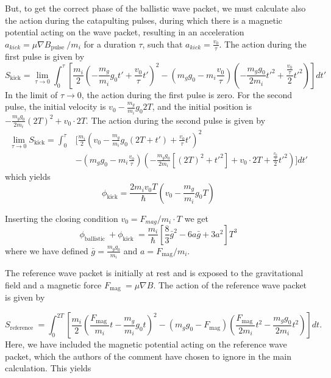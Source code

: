 \documentclass[aps,prx,onecolumn,superscriptaddress,longbibliography]{revtex4-2}
\begin{document}
\begin{appendix}
But, to get the correct phase of the ballistic wave packet, we must calculate also the action during the catapulting pulses, during which there is a magnetic potential acting on the wave packet, resulting in an acceleration $a_{kick} = \mu\nabla B_{\text {pulse }}/m_i$ for a duration $\tau$, such that $a_{kick}= \frac{v_0}{\tau}$. The action during the first pulse is given by
\begin{equation}
    S_{\text {kick}}=\lim _{\tau \rightarrow 0}\int_{0}^{\tau}\left[\frac{m_i}{2}\left(-\frac{m_g}{m_i} g_0 t' +\frac{v_0}{\tau} t'\right)^2-(m_g g_0 - m_i \frac{v_0}{\tau})\left(-\frac{m_g g_0}{2 m_i} t'^2 +\frac{\frac{v_0}{\tau}}{2} t'^2\right)\right] d t'
\end{equation}
In the limit of $\tau \to 0$, the action during the first pulse is zero. For the second pulse, the initial velocity is $v_0 - \frac{m_g}{m_i} g_0 2T$, and the initial position is $-\frac{m_g g_0}{2 m_i} (2T)^2 +v_0\cdot 2T$. The action during the second pulse is given by
\begin{align}
    \lim _{\tau \rightarrow 0}S_{\text {kick}} = \int_{0}^{\tau} & \Bigg[\frac{m_i}{2}\left(v_0 - \frac{m_g}{m_i} g_0(2T+t') +\frac{v_0}{\tau} t'\right)^2 \nonumber \\
    & -(m_g g_0 - m_i \frac{v_0}{\tau})\left(-\frac{m_g g_0}{2 m_i} [(2T)^2+t'^2] +v_0\cdot 2T +\frac{\frac{v_0}{\tau}}{2} t'^2\right)\Bigg] d t'
\end{align}
which yields
\begin{equation}
    \phi_{\text {kick}} = \frac{2 m_i v_0 T}{\hbar}\left(v_0-\frac{m_g}{m_i} g_0 T\right)
\end{equation}


Inserting the closing condition $v_0=F_{m a g} / m_i \cdot T$ we get
\begin{equation}
    \phi_{\text {ballistic }}+\phi_{\text {kick }}=\frac{m_i}{\hbar}\left[\frac{8}{3} \bar{g}^2-6 a \bar{g}+3 a^2\right] T^3
    \end{equation}
where we have defined $\bar{g} = \frac{m_g g_0}{m_i}$ and $a=F_{\text {mag}}/m_i$.

The reference wave packet is initially at rest and is exposed to the gravitational field and a magnetic force $F_{\text {mag }} =\mu \nabla B$. The action of the reference wave packet is given by

\begin{equation}
    S_{\text {reference }}=\int_0^{2 T}\left[\frac{m_i}{2}\left(\frac{F_{\text {mag }}}{m_i} t-\frac{m_g}{m_i} g_0 t\right)^2-(m_g g_0 -F_{\text {mag}}) \left(\frac{F_{\text {mag }}}{2 m_i} t^2-\frac{m_g g_0}{2 m_i} t^2\right)\right] d t .
\end{equation}
Here, we have included the magnetic potential acting on the reference wave packet, which the authors of the comment have chosen to ignore in the main calculation. This yields


\end{appendix}
\end{document}
